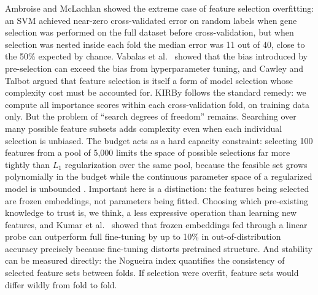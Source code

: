 Ambroise and McLachlan \citep{Ambroise2002} showed the extreme case of feature selection overfitting: an SVM achieved near-zero cross-validated error on random labels when gene selection was performed on the full dataset before cross-validation, but when selection was nested inside each fold the median error was 11 out of 40, close to the 50\% expected by chance. Vabalas et al.\ \citep{Vabalas2019} showed that the bias introduced by pre-selection can exceed the bias from hyperparameter tuning, and Cawley and Talbot \citep{Cawley2010} argued that feature selection is itself a form of model selection whose complexity cost must be accounted for. KIRBy follows the standard remedy: we compute all importance scores within each cross-validation fold, on training data only. But the problem of ``search degrees of freedom'' \citep{Tibshirani2015} remains. Searching over many possible feature subsets adds complexity even when each individual selection is unbiased. The budget acts as a hard capacity constraint: selecting 100 features from a pool of 5,000 limits the space of possible selections far more tightly than $L_1$ regularization over the same pool, because the feasible set grows polynomially in the budget while the continuous parameter space of a regularized model is unbounded \citep{Ng2004}. Important here is a distinction: the features being selected are frozen embeddings, not parameters being fitted. Choosing which pre-existing knowledge to trust is, we think, a less expressive operation than learning new features, and Kumar et al.\ \citep{Kumar2022} showed that frozen embeddings fed through a linear probe can outperform full fine-tuning by up to 10\% in out-of-distribution accuracy precisely because fine-tuning distorts pretrained structure. And stability can be measured directly: the Nogueira index \citep{Nogueira2018} quantifies the consistency of selected feature sets between folds. If selection were overfit, feature sets would differ wildly from fold to fold.

